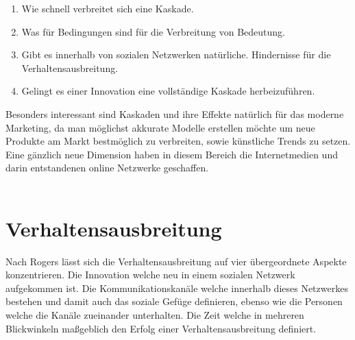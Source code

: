 \documentclass[12pt]{article}
\begin{document}
\begin{enumerate}
\item Wie schnell verbreitet sich eine Kaskade.
\item Was für Bedingungen sind für die Verbreitung von Bedeutung.
\item Gibt es innerhalb von sozialen Netzwerken natürliche. Hindernisse für die Verhaltensausbreitung.
\item Gelingt es einer Innovation eine vollständige Kaskade herbeizuführen.
\end{enumerate}
Besonders interessant sind Kaskaden und ihre Effekte natürlich für das moderne Marketing, da man möglichst akkurate Modelle erstellen möchte um neue Produkte am Markt bestmöglich zu verbreiten, sowie künstliche Trends zu setzen. Eine gänzlich neue Dimension haben in diesem Bereich die Internetmedien und darin entstandenen online Netzwerke geschaffen.\\\\



\section{Verhaltensausbreitung}
Nach Rogers lässt sich die Verhaltensausbreitung auf vier übergeordnete Aspekte konzentrieren. Die Innovation welche neu in  einem sozialen Netzwerk aufgekommen ist. Die Kommunikationskanäle welche innerhalb dieses Netzwerkes bestehen und damit auch das soziale Gefüge definieren, ebenso wie die Personen welche die Kanäle zueinander unterhalten. Die Zeit welche in mehreren Blickwinkeln maßgeblich den Erfolg einer Verhaltensausbreitung definiert.
\end{document}
